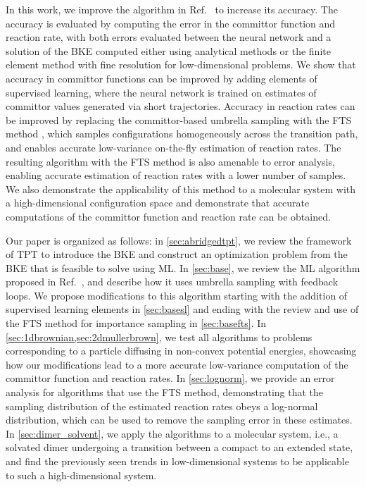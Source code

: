 \documentclass{article}
\numberwithin{equation}{section}
\theoremstyle{definition}
\theoremstyle{remark}
\begin{document}
In this work, we improve the algorithm in Ref.~\cite{rotskoff2020learning} to increase its accuracy.
The accuracy is evaluated by computing the error in the committor function and reaction rate, 
with both errors evaluated between the neural network and a solution of the BKE computed either using analytical methods or the finite element method with fine resolution for low-dimensional problems.
We show that accuracy in committor functions can be improved by
adding elements of supervised learning, where the neural network is trained on estimates of committor values generated via short trajectories. Accuracy in reaction rates can be improved by replacing the committor-based umbrella sampling with the FTS method \cite{vanden2009revisiting}, which samples configurations homogeneously across the transition path, and enables accurate low-variance on-the-fly estimation of reaction rates. 
The resulting algorithm with the FTS method is also amenable to error analysis, enabling accurate estimation of reaction rates with a lower number of samples. 
We also demonstrate the applicability of this method to a molecular system with a high-dimensional configuration space and demonstrate that accurate computations of the committor function and reaction rate can be obtained.

Our paper is organized as follows: in \cref{sec:abridgedtpt}, we review the framework of TPT to introduce the BKE and construct an optimization problem from the BKE that is feasible to solve using ML. 
In \cref{sec:base}, we review the ML algorithm proposed in Ref.~\cite{rotskoff2020learning}, and describe how it uses umbrella sampling with feedback loops. 
We propose modifications to this algorithm starting with the addition of supervised learning elements in \cref{sec:basesl} and ending
with the review and use of the FTS method for importance sampling in \cref{sec:basefts}. 
In \cref{sec:1dbrownian,sec:2dmullerbrown}, we test all algorithms to problems corresponding to a particle diffusing in non-convex potential energies, showcasing how our modifications lead to a more accurate low-variance computation of the committor function and reaction rates. In \cref{sec:lognorm}, we provide an error analysis for algorithms that use the FTS method, demonstrating that the sampling distribution of the estimated reaction rates obeys a log-normal distribution, which can be used to remove the sampling error in these estimates.
In \cref{sec:dimer_solvent}, we apply the algorithms to a molecular system, i.e., a solvated dimer undergoing a transition between a compact to an extended state, and find the previously seen trends in low-dimensional systems to be applicable to such a high-dimensional system. 
\end{document}
